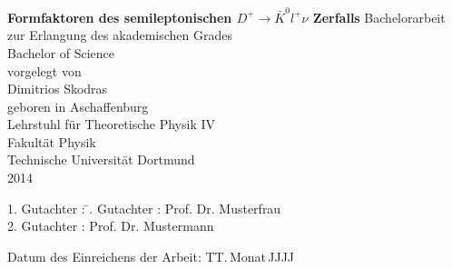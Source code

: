\documentclass[11pt,a4paper,twoside]{report}
\begin{document}

%
%


\newcommand{\thetitle}{Formfaktoren des semileptonischen $D^+ \rightarrow \bar K^0 l^+ \nu$ Zerfalls}

\thispagestyle{empty}
\begin{center}
\Huge\textbf{\thetitle}
\vfill
\vfill
\Large
Bachelorarbeit \\ zur Erlangung des akademischen Grades \\ Bachelor of Science \\
\vspace{20pt}
\normalsize
vorgelegt von \\[5pt]
{\Large Dimitrios Skodras} \\[5pt]
geboren in Aschaffenburg \\
\vspace{20pt}
Lehrstuhl für Theoretische Physik IV \\ Fakultät Physik \\
Technische Universität Dortmund \\ 2014
\end{center}
\newpage


\thispagestyle{empty}
\vspace*{\fill}
\begin{tabbing}
1. Gutachter : \=. Gutachter : \>Prof. Dr. Musterfrau \\[11pt]
2. Gutachter : \>Prof. Dr. Mustermann \\[11pt]
\end{tabbing}
\vspace{11pt}
Datum des Einreichens der Arbeit: TT.\,Monat\,JJJJ
\newpage

\end{document}
